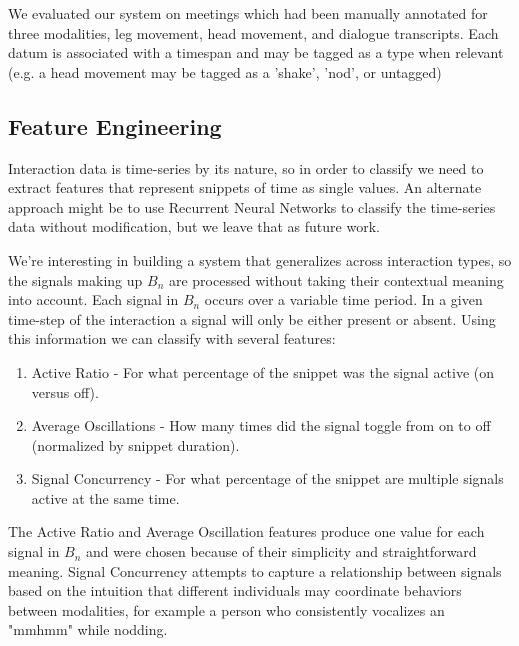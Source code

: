 \documentclass[conference]{IEEEtran}
\newcommand{\meta}[1]{{\textcolor[rgb]{0.1,0.7,0.2}{[JSS: {\it #1}]}}}
\begin{document}
We evaluated our system on meetings which had been manually annotated for three modalities, leg movement, head movement, and dialogue transcripts. Each datum is associated with a timespan and may be tagged as a type when relevant (e.g. a head movement may be tagged as a 'shake', 'nod', or untagged)

\subsection{Feature Engineering}\label{feature_engineering}
Interaction data is time-series by its nature, so in order to classify we need to extract features that represent snippets of time as single values. An alternate approach might be to use Recurrent Neural Networks to classify the time-series data without modification, but we leave that as future work. 

We're interesting in building a system that generalizes across interaction types, so the signals making up $B_n$ are processed without taking their contextual meaning into account. Each signal in $B_n$ occurs over a variable time period. In a given time-step of the interaction a signal will only be either present or absent. Using this information we can classify with several features:

\begin{enumerate}
    \item Active Ratio - For what percentage of the snippet was the signal active (on versus off).
    \item Average Oscillations - How many times did the signal toggle from on to off (normalized by snippet duration). 
    \item Signal Concurrency - For what percentage of the snippet are multiple signals active at the same time. 
\end{enumerate}

The Active Ratio and Average Oscillation features produce one value for each signal in $B_n$ and were chosen because of their simplicity and straightforward meaning. Signal Concurrency attempts to capture a relationship between signals based on the intuition that different individuals may coordinate behaviors between modalities, for example a person who consistently vocalizes an "mmhmm" while nodding. 

\end{document}
